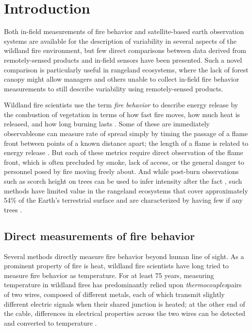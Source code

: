 \documentclass[fire,article,submit,oneauthor,pdftex]{Definitions/mdpi}
\begin{document}
\section{Introduction}

Both in-field measurements of fire behavior and satellite-based earth observation systems are available for the description of variability in several aspects of the wildland fire environment, but few direct comparisons between data derived from remotely-sensed products and in-field sensors have been presented. 
Such a novel comparison is particularly useful in rangeland ecosystems, where the lack of forest canopy might allow managers and others unable to collect in-field fire behavior measurements to still describe variability using remotely-sensed products.  

Wildland fire scientists use the term \emph{fire behavior} to describe energy release by the combustion of vegetation in terms of how fast fire moves, how much heat is released, and how long burning lasts \cite{mcgranahan2021a, finney2021}. 
Some of these are immediately observable\textemdash one can measure rate of spread simply by timing the passage of a flame front between points of a known distance apart; the length of a flame is related to energy release \cite{rothermel1980}. 
But each of these metrics require direct observation of the flame front, which is often precluded by smoke, lack of access, or the general danger to personnel posed by fire moving freely about. 
And while post-burn observations such as scorch height on trees can be used to infer intensity after the fact \cite{rothermel1980}, such methods have limited value in the rangeland ecosystems that cover approximately 54\% of the Earth's terrestrial surface and are characterized by having few if any trees \cite{ilri2021}. 

\subsection{Direct measurements of fire behavior} 

Several methods directly measure fire behavior beyond human line of sight. 
As a prominent property of fire is heat, wildland fire scientists have long tried to measure fire behavior as temperature.
For at least 75 years, measuring temperature in wildland fires has predominantly relied upon \emph{thermocouples}\textemdash pairs of two wires, composed of different metals, each of which transmit slightly different electric signals when their shared junction is heated; at the other end of the cable, differences in electrical properties across the two wires can be detected and converted to temperature \cite{vaartaja1949, engle1989,mcgranahan2020a, pavlasek2015, shannon2003}. 
\end{document}
